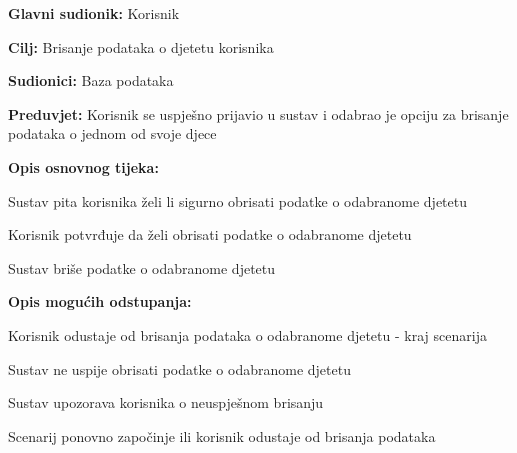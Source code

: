 					\noindent {}
					\begin{packed_item}
	
						\item \textbf{Glavni sudionik: }Korisnik
						\item  \textbf{Cilj:} Brisanje podataka o djetetu korisnika
						\item  \textbf{Sudionici:} Baza podataka
						\item  \textbf{Preduvjet:} Korisnik se uspješno prijavio u sustav i odabrao je opciju za brisanje podataka o jednom od svoje djece
						\item  \textbf{Opis osnovnog tijeka:}
						
						\item[] \begin{packed_enum}
							\item Sustav pita korisnika želi li sigurno obrisati podatke o odabranome djetetu
							\item Korisnik potvrđuje da želi obrisati podatke o odabranome djetetu
							\item Sustav briše podatke o odabranome djetetu
						\end{packed_enum}

						\item  \textbf{Opis mogućih odstupanja:}

						\item[] \begin{packed_item}
							\item[2.a] Korisnik odustaje od brisanja podataka o odabranome djetetu - kraj scenarija
							\item[3.a] Sustav ne uspije obrisati podatke o odabranome djetetu
							\item[] \begin{packed_enum}
								\item Sustav upozorava korisnika o neuspješnom brisanju
								\item Scenarij ponovno započinje ili korisnik odustaje od brisanja podataka
							\end{packed_enum}					
						\end{packed_item}
					\end{packed_item}	


